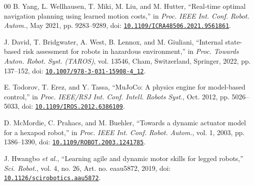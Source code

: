 \documentclass{ieeeaccess}
\begin{document}
\begin{thebibliography}{00}
B. Yang, L. Wellhausen, T. Miki, M. Liu, and M. Hutter, \textquotedblleft{}Real-time optimal navigation planning using learned motion costs,\textquotedblright{} in \emph{Proc. IEEE Int. Conf. Robot. Autom.}, May 2021, pp. 9283--9289, doi: \href{https://doi.org/10.1109/ICRA48506.2021.9561861}{\nolinkurl{10.1109/ICRA48506.2021.9561861}}.

J. David, T. Bridgwater, A. West, B. Lennox, and M. Giuliani, \textquotedblleft{}Internal state-based risk assessment for robots in hazardous environment,\textquotedblright{} in \emph{Proc. Towards Auton. Robot. Syst. (TAROS)}, vol. 13546, Cham, Switzerland, Springer, 2022, pp. 137--152, doi: \href{https://doi.org/10.1007/978-3-031-15908-4_12}{\nolinkurl{10.1007/978-3-031-15908-4_12}}.

E. Todorov, T. Erez, and Y. Tassa, \textquotedblleft{}MuJoCo: A physics engine for model-based control,\textquotedblright{} in \emph{Proc. IEEE/RSJ Int. Conf. Intell. Robots Syst.}, Oct. 2012, pp. 5026--5033, doi: \href{https://doi.org/10.1109/IROS.2012.6386109}{\nolinkurl{10.1109/IROS.2012.6386109}}.

D. McMordie, C. Prahacs, and M. Buehler, \textquotedblleft{}Towards a dynamic actuator model for a hexapod robot,\textquotedblright{} in \emph{Proc. IEEE Int. Conf. Robot. Autom.}, vol. 1, 2003, pp. 1386--1390, doi: \href{https://doi.org/10.1109/ROBOT.2003.1241785}{\nolinkurl{10.1109/ROBOT.2003.1241785}}.

J. Hwangbo \emph{et al.}, \textquotedblleft{}Learning agile and dynamic motor skills for legged robots,\textquotedblright{} \emph{Sci. Robot.}, vol. 4, no. 26, Art. no. eaau5872, 2019, doi: \href{https://doi.org/10.1126/scirobotics.aau5872}{\nolinkurl{10.1126/scirobotics.aau5872}}.
\end{thebibliography}

\clearpage
{}
\begingroup
\hypersetup{bookmarksdepth=1}
\makeatletter
\renewcommand{\@IEEEBIOskipN}{.5\baselineskip}
\makeatother

\endgroup
\EOD
\end{document}
